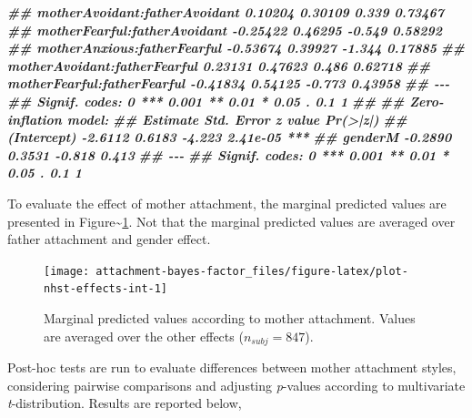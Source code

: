 \documentclass[
]{book}
\newenvironment{Shaded}{\begin{snugshade}}{\end{snugshade}}
\newcommand{\DocumentationTok}[1]{\textcolor[rgb]{0.56,0.35,0.01}{\textbf{\textit{#1}}}}
\begin{document}
\begin{Shaded}
\begin{Highlighting}[]
\DocumentationTok{\#\# motherAvoidant:fatherAvoidant  0.10204    0.30109   0.339  0.73467    }
\DocumentationTok{\#\# motherFearful:fatherAvoidant  {-}0.25422    0.46295  {-}0.549  0.58292    }
\DocumentationTok{\#\# motherAnxious:fatherFearful   {-}0.53674    0.39927  {-}1.344  0.17885    }
\DocumentationTok{\#\# motherAvoidant:fatherFearful   0.23131    0.47623   0.486  0.62718    }
\DocumentationTok{\#\# motherFearful:fatherFearful   {-}0.41834    0.54125  {-}0.773  0.43958    }
\DocumentationTok{\#\# {-}{-}{-}}
\DocumentationTok{\#\# Signif. codes:  0 \textquotesingle{}***\textquotesingle{} 0.001 \textquotesingle{}**\textquotesingle{} 0.01 \textquotesingle{}*\textquotesingle{} 0.05 \textquotesingle{}.\textquotesingle{} 0.1 \textquotesingle{} \textquotesingle{} 1}
\DocumentationTok{\#\# }
\DocumentationTok{\#\# Zero{-}inflation model:}
\DocumentationTok{\#\#             Estimate Std. Error z value Pr(\textgreater{}|z|)    }
\DocumentationTok{\#\# (Intercept)  {-}2.6112     0.6183  {-}4.223 2.41e{-}05 ***}
\DocumentationTok{\#\# genderM      {-}0.2890     0.3531  {-}0.818    0.413    }
\DocumentationTok{\#\# {-}{-}{-}}
\DocumentationTok{\#\# Signif. codes:  0 \textquotesingle{}***\textquotesingle{} 0.001 \textquotesingle{}**\textquotesingle{} 0.01 \textquotesingle{}*\textquotesingle{} 0.05 \textquotesingle{}.\textquotesingle{} 0.1 \textquotesingle{} \textquotesingle{} 1}
\end{Highlighting}
\end{Shaded}

To evaluate the effect of mother attachment, the marginal predicted values are presented in Figure\textasciitilde\ref{fig:plot-nhst-effects-int}. Not that the marginal predicted values are averaged over father attachment and gender effect.

\begin{figure}

{\centering \texttt{[image: attachment-bayes-factor\_files/figure-latex/plot-nhst-effects-int-1]} 

}

\caption{Marginal predicted values according to mother attachment. Values are averaged over the other effects ($n_{subj} = 847$).}\label{fig:plot-nhst-effects-int}
\end{figure}

Post-hoc tests are run to evaluate differences between mother attachment styles, considering pairwise comparisons and adjusting \emph{p}-values according to multivariate \emph{t}-distribution. Results are reported below,
\end{document}
